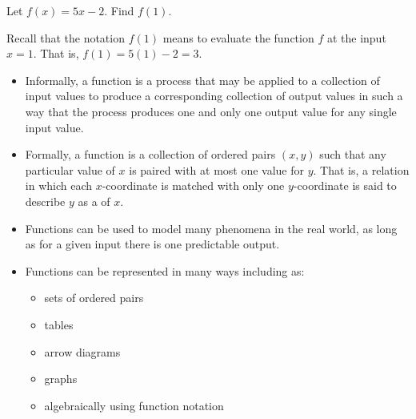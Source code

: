 \documentclass{ximera}
\begin{document}
\begin{example}
Let $f(x)=5x-2$.  Find $f(1)$.

\begin{explanation}
Recall that the notation $f(1)$ means to evaluate the function $f$ at the input $x=1$.  That is, $f(1)=5(1)-2=3$.
\end{explanation}
\end{example}

\begin{summary}\begin{itemize}
\item Informally, a function is a process that may be applied to a collection of input values to produce a corresponding collection of output values in such a way that the process produces one and only one output value for any single input value.
\item Formally, a function  is a collection of ordered pairs $(x,y)$ such that any particular value of $x$ is paired with at most one value for $y$. That is, a relation in which each $x$-coordinate is matched with only one $y$-coordinate is said to describe $y$ as a  of $x$.
\item Functions can be used to model many phenomena in the real world, as long as for a given input there is one predictable output.
\item Functions can be represented in many ways including as:
\begin{itemize}
\item sets of ordered pairs
\item tables
\item arrow diagrams
\item graphs
\item algebraically using function notation
\end{itemize}
\end{itemize}\end{summary}
\end{document}
